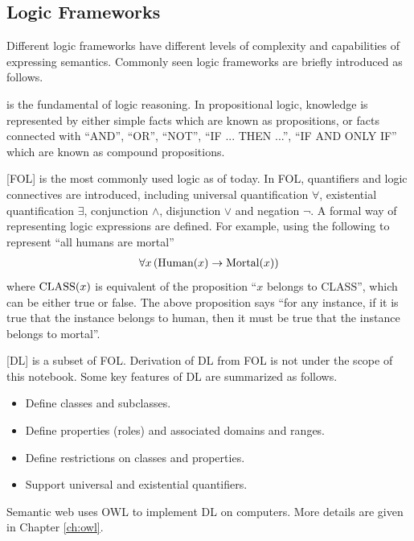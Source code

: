 \subsection{Logic Frameworks} \label{subsec:knowledgeandlogic}

Different logic frameworks have different levels of complexity and capabilities of expressing semantics. Commonly seen logic frameworks are briefly introduced as follows.

 is the fundamental of logic reasoning. In propositional logic, knowledge is represented by either simple facts which are known as propositions, or facts connected with ``AND'', ``OR'', ``NOT'', ``IF ... THEN ...'', ``IF AND ONLY IF'' which are known as compound propositions.

[FOL] is the most commonly used logic as of today. In FOL, quantifiers and logic connectives are introduced, including universal quantification $\forall$, existential quantification $\exists$, conjunction $\land$, disjunction $\lor$ and negation $\neg$. A formal way of representing logic expressions are defined. For example, using the following to represent ``all humans are mortal''
\begin{eqnarray}
	\forall x \left(\textup{Human}(x) \rightarrow \textup{Mortal}(x)\right) \nonumber
\end{eqnarray}
where $\textup{CLASS}(x)$ is equivalent of the proposition ``$x$ belongs to CLASS'', which can be either true or false. The above proposition says ``for any instance, if it is true that the instance belongs to human, then it must be true that the instance belongs to mortal''.

[DL] is a subset of FOL. Derivation of DL from FOL is not under the scope of this notebook. Some key features of DL are summarized as follows.
\begin{itemize}
	\item Define classes and subclasses.
	\item Define properties (roles) and associated domains and ranges.
	\item Define restrictions on classes and properties.
	\item Support universal and existential quantifiers.
\end{itemize}
Semantic web uses OWL to implement DL on computers. More details are given in Chapter \ref{ch:owl}.


